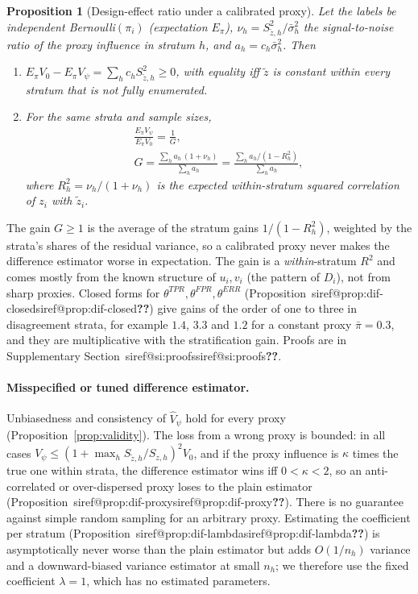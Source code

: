 \documentclass[pdflatex,sn-mathphys-num,iicol]{sn-jnl}
\makeatletter
\theoremstyle{thmstyleone}
\newtheorem{proposition}{Proposition}
\theoremstyle{thmstyletwo}
\theoremstyle{thmstylethree}
\newcommand{\SIref}[1]{\ifcsname siref@#1\endcsname\csname siref@#1\endcsname\else\textbf{??}\fi}
\makeatother
\begin{document}
\begin{proposition}[Design-effect ratio under a calibrated proxy]\label{prop:dif-deff}
Let the labels be independent Bernoulli$(\pi_i)$ (expectation $E_\pi$), $\nu_h=S^2_{\tilde z,h}/\bar\sigma^2_h$ the signal-to-noise ratio of the proxy
influence in stratum $h$, and $a_h=c_h\bar\sigma^2_h$. Then
\begin{enumerate}
\item[(a)] $E_\pi V_0-E_\pi V_\psi=\sum_hc_hS^2_{\tilde z,h}\ge0$, with equality iff $\tilde z$ is constant within every stratum that is not fully enumerated.
\item[(b)] For the same strata and sample sizes,
\begin{equation}\label{eq:dif-deff}
\begin{gathered}
\frac{E_\pi V_\psi}{E_\pi V_0}=\frac1G,\\
G=\frac{\sum_ha_h\,(1+\nu_h)}{\sum_ha_h}=\frac{\sum_ha_h/(1-R_h^2)}{\sum_ha_h},
\end{gathered}
\end{equation}
where $R_h^2=\nu_h/(1+\nu_h)$ is the expected within-stratum squared correlation of $z_i$ with $\tilde z_i$.
\end{enumerate}
\end{proposition}

The gain $G\ge1$ is the average of the stratum gains $1/(1-R_h^2)$, weighted by the strata's shares of the residual variance, so a calibrated
proxy never makes the difference estimator worse in expectation. The gain is a \emph{within}-stratum $R^2$ and comes mostly from the known structure of
$u_i,v_i$ (the pattern of $D_i$), not from sharp proxies. Closed forms for $\theta^{TPR},\theta^{FPR},\theta^{ERR}$
(Proposition~\SIref{prop:dif-closed}) give gains of the order of one to three in disagreement strata, for example $1.4$, $3.3$ and $1.2$ for a constant proxy $\bar\pi=0.3$, and
they are multiplicative with the stratification gain. Proofs are in Supplementary Section~\SIref{si:proofs}.

\paragraph{Misspecified or tuned difference estimator.} Unbiasedness and consistency of $\hat V_\psi$ hold for every proxy
(Proposition~\ref{prop:validity}). The loss from a wrong proxy is bounded: in all cases $V_\psi\le(1+\max_hS_{\tilde z,h}/S_{z,h})^2V_0$,
and if the proxy influence is $\kappa$ times the true one within strata, the difference estimator wins iff $0<\kappa<2$, so an anti-correlated or over-dispersed proxy loses to the plain estimator
(Proposition~\SIref{prop:dif-proxy}). There is no guarantee against simple random sampling for an arbitrary proxy. Estimating the coefficient per stratum
(Proposition~\SIref{prop:dif-lambda}) is asymptotically never worse than the plain estimator but adds $O(1/n_h)$ variance and a downward-biased
variance estimator at small $n_h$; we therefore use the fixed coefficient $\lambda=1$, which has no estimated parameters.
\end{document}
